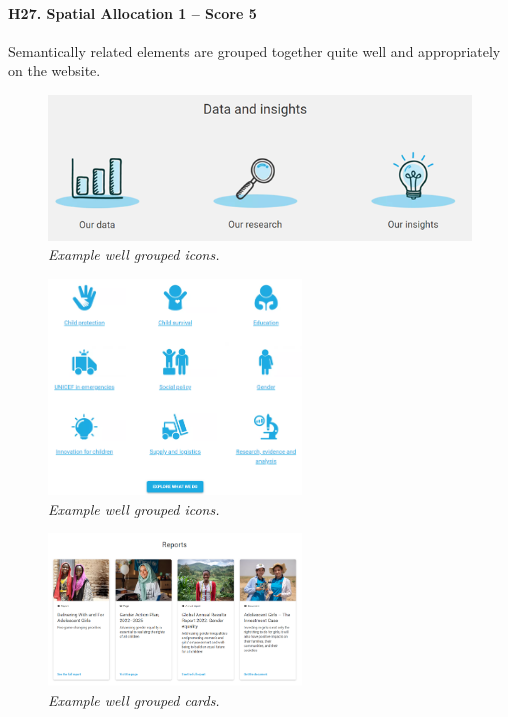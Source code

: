 \paragraph*{H27. Spatial Allocation 1 – Score 5}
Semantically related elements are grouped together quite well and appropriately on the website.
\begin{figure}[h]
	\includegraphics[width=\textwidth]{Picture24.png}
	\captionsetup{font=small}
	\caption{\textit{Example well grouped icons.}}
	\label{fig:label24}
\end{figure}
\begin{figure}[h]
	\centering
	\begin{center}
		\includegraphics[width=0.6\textwidth]{Picture26.png}
	\end{center}
	\captionsetup{font=small}
	\caption{\textit{Example well grouped icons.}}
	\label{fig:label25}
\end{figure}
\begin{figure}[h]
	\centering
	\begin{center}
		\includegraphics[width=0.6\textwidth]{Picture25.png}
	\end{center}
	\captionsetup{font=small}
	\caption{\textit{Example well grouped cards.}}
	\label{fig:label26}
\end{figure}

